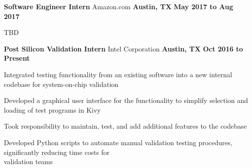 \begin{cventries}
  \cventry
    {\normalsize \textbf{Software Engineer Intern}}
    {\large Amazon.com}
    {\normalsize \textbf{Austin, TX}}
    {\normalsize \textbf{May 2017 to Aug 2017}}
    {
      \begin{cvitems}
        \item {\normalsize TBD}
      \end{cvitems}
    }
  \cventry
    {\normalsize \textbf{Post Silicon Validation Intern}}
    {\large Intel Corporation}
    {\normalsize \textbf{Austin, TX}}
    {\normalsize \textbf{Oct 2016 to Present}}
    {
      \begin{cvitems}
        \item {\normalsize Integrated testing functionality from an existing software into a new internal codebase for system-on-chip validation}
        \item {\normalsize Developed a graphical user interface for the functionality to simplify selection and loading of test programs in Kivy}
        \item {\normalsize Took responsibility to maintain, test, and add additional features to the codebase}
        \item {\normalsize Developed Python scripts to automate manual validation testing procedures, significantly reducing time costs for \\validation teams}
      \end{cvitems}
    }
\end{cventries}
